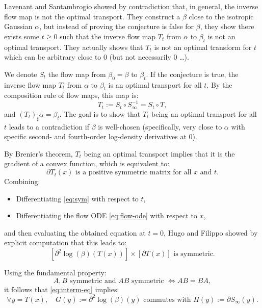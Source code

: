\documentclass{article}
\begin{document}
Lavenant and Santambrogio showed by contradiction that, in general, the inverse flow map is not the optimal transport. They construct a $\beta$ close to the isotropic Gaussian $\alpha$, but instead of proving the conjecture is false for $\beta$, they show there exists some $t \geq 0$ such that the inverse flow map $T_t$ from $\alpha$ to $\beta_t$ is not an optimal transport. They actually shows that $T_t$ is not an optimal transform for $t$ which can be arbitrary close to 0 (but not necessarily 0 \ldots).

We denote $S_t$ the flow map from $\beta_0 = \beta$ to $\beta_t$. If the conjecture is true, the inverse flow map $T_t$ from $\alpha$ to $\beta_t$ is an optimal transport for all $t$. By the composition rule of flow maps, this map is:
\begin{equation}
    T_t := S_t \circ S_\infty^{-1} = S_t \circ T,
\end{equation}
and $(T_t)_\sharp \alpha = \beta_t$. The goal is to show that $T_t$ being an optimal transport for all $t$ leads to a contradiction if $\beta$ is well-chosen (specifically, very close to $\alpha$ with specific second- and fourth-order log-density derivatives at 0).

By Brenier's theorem, $T_t$ being an optimal transport implies that it is the gradient of a convex function, which is equivalent to:
\begin{equation}\label{eq:sym}
    \partial T_t(x) \text{ is a positive symmetric matrix for all } x \text{ and } t. 
\end{equation}
Combining:
\begin{itemize}
\item Differentiating \eqref{eq:sym} with respect to $t$,
\item Differentiating the flow ODE \eqref{eq:flow-ode} with respect to $x$,
\end{itemize}
and then evaluating the obtained equation at $t = 0$, Hugo and Filippo showed by explicit computation that this leads to:
\begin{equation}\label{eq:interm-eq}
    [\partial^2 \log(\beta)(T(x))] \times [\partial T(x)] \text{ is symmetric.} 
\end{equation}

Using the fundamental property:
\[
    A, B \text{ symmetric and } AB \text{ symmetric } \iff AB = BA,
\]
it follows that \eqref{eq:interm-eq} implies:
\begin{equation}
    \forall y = T(x), \quad G(y) := \partial^2 \log(\beta)(y) \text{ commutes with } H(y) := \partial S_\infty(y).
\end{equation}
\end{document}
